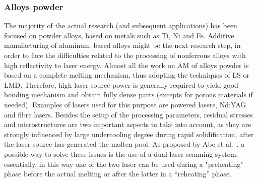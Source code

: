 \subsubsection{Alloys powder}
The majority of the actual research (and subsequent applications) has been focused on powder alloys, based on metals such as Ti, Ni and Fe. Additive manufacturing of aluminum--based alloys might be the next research step, in order to face the difficulties related to the processing of nonferrous alloys with high reflectivity to laser energy. Almost all the work on AM of alloys powder is based on a complete melting mechanism, thus adopting the techniques of LS or LMD. Therefore, high laser source power is generally required to yield good bonding mechanism and obtain fully dense parts (excepts for porous materials if needed). Examples of lasers used for this purpose are  powered lasers, Nd:YAG and fibre lasers. Besides the setup of the processing parameters, residual stresses and microstructures are two important aspects to take into account, as they are strongly influenced by large undercooling degree during rapid solidification, after the laser source has generated the molten pool. As proposed by Abe et al.~\cite{abe+01jmatproctech}, a possible way to solve these issues is the use of a dual laser scanning system; essentially, in this way one of the two laser can be used during a "preheating" phase before the actual melting or after the latter in a ``reheating'' phase.


